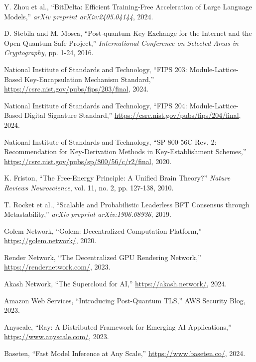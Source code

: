 \documentclass[11pt,twocolumn]{article}
\begin{document}

\begin{thebibliography}{99}

Y. Zhou et al., ``BitDelta: Efficient Training-Free Acceleration of Large Language Models,''
\textit{arXiv preprint arXiv:2405.04144}, 2024.

D. Stebila and M. Mosca, ``Post-quantum Key Exchange for the Internet and the Open Quantum Safe Project,''
\textit{International Conference on Selected Areas in Cryptography}, pp. 1-24, 2016.

National Institute of Standards and Technology,
``FIPS 203: Module-Lattice-Based Key-Encapsulation Mechanism Standard,''
\url{https://csrc.nist.gov/pubs/fips/203/final}, 2024.

National Institute of Standards and Technology,
``FIPS 204: Module-Lattice-Based Digital Signature Standard,''
\url{https://csrc.nist.gov/pubs/fips/204/final}, 2024.

National Institute of Standards and Technology,
``SP 800-56C Rev. 2: Recommendation for Key-Derivation Methods in Key-Establishment Schemes,''
\url{https://csrc.nist.gov/pubs/sp/800/56/c/r2/final}, 2020.

K. Friston, ``The Free-Energy Principle: A Unified Brain Theory?''
\textit{Nature Reviews Neuroscience}, vol. 11, no. 2, pp. 127-138, 2010.

T. Rocket et al., ``Scalable and Probabilistic Leaderless BFT Consensus through Metastability,''
\textit{arXiv preprint arXiv:1906.08936}, 2019.

Golem Network, ``Golem: Decentralized Computation Platform,''
\url{https://golem.network/}, 2020.

Render Network, ``The Decentralized GPU Rendering Network,''
\url{https://rendernetwork.com/}, 2023.

Akash Network, ``The Supercloud for AI,''
\url{https://akash.network/}, 2024.

Amazon Web Services, ``Introducing Post-Quantum TLS,''
AWS Security Blog, 2023.

Anyscale, ``Ray: A Distributed Framework for Emerging AI Applications,''
\url{https://www.anyscale.com/}, 2023.

Baseten, ``Fast Model Inference at Any Scale,''
\url{https://www.baseten.co/}, 2024.


\end{thebibliography}
\end{document}
